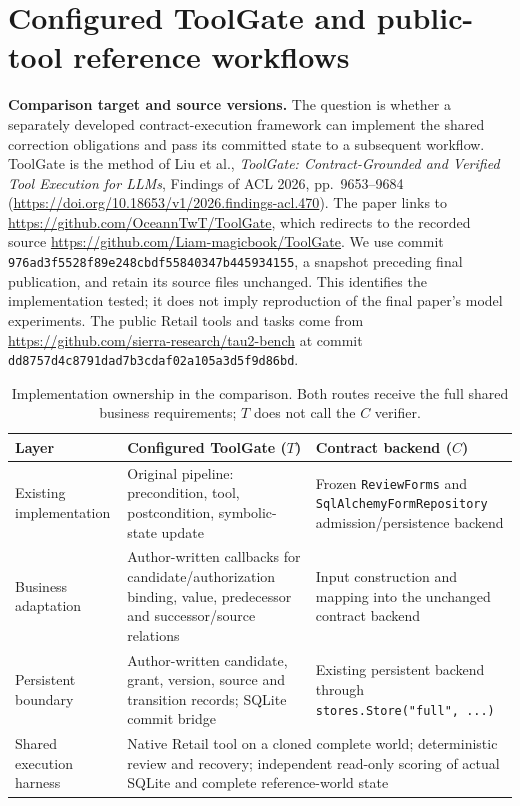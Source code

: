 \documentclass[10pt,a4paper]{article}
\begin{document}
\section{Configured ToolGate and public-tool reference workflows}
\label{sec:a8-toolgate}
\textbf{Comparison target and source versions.}
The question is whether a separately developed contract-execution framework can implement the shared correction obligations and pass its committed state to a subsequent workflow. ToolGate is the method of Liu et al., \emph{ToolGate: Contract-Grounded and Verified Tool Execution for LLMs}, Findings of ACL 2026, pp.~9653--9684 (\url{https://doi.org/10.18653/v1/2026.findings-acl.470}). The paper links to \url{https://github.com/OceannTwT/ToolGate}, which redirects to the recorded source \url{https://github.com/Liam-magicbook/ToolGate}. We use commit \nolinkurl{976ad3f5528f89e248cbdf55840347b445934155}, a snapshot preceding final publication, and retain its source files unchanged. This identifies the implementation tested; it does not imply reproduction of the final paper's model experiments. The public Retail tools and tasks come from \url{https://github.com/sierra-research/tau2-bench} at commit \nolinkurl{dd8757d4c8791dad7b3cdaf02a105a3d5f9d86bd}.

\begin{table}[htbp]
\centering\small
\caption{Implementation ownership in the comparison. Both routes receive the full shared business requirements; $T$ does not call the $C$ verifier.}
\begin{tabularx}{\textwidth}{@{}p{}XX@{}}
\toprule
Layer & Configured ToolGate ($T$) & Contract backend ($C$)\\
\midrule
Existing implementation & Original pipeline: precondition, tool, postcondition, symbolic-state update & Frozen \texttt{ReviewForms} and \texttt{SqlAlchemyFormRepository} admission/persistence backend\\
Business adaptation & Author-written callbacks for candidate/authorization binding, value, predecessor and successor/source relations & Input construction and mapping into the unchanged contract backend\\
Persistent boundary & Author-written candidate, grant, version, source and transition records; SQLite commit bridge & Existing persistent backend through \texttt{stores.Store("full", ...)}\\
Shared execution harness & \multicolumn{2}{p{0.72\textwidth}}{Native Retail tool on a cloned complete world; deterministic review and recovery; independent read-only scoring of actual SQLite and complete reference-world state}\\
\bottomrule
\end{tabularx}
\end{table}
\end{document}
